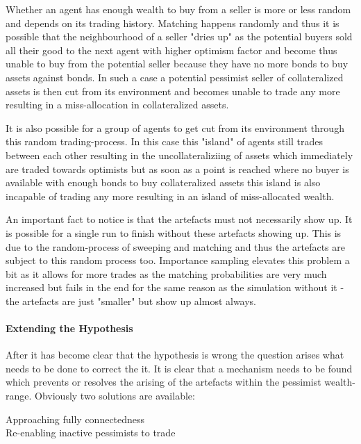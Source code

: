 \documentclass[Bachelorarbeit.tex]{subfiles}
\begin{document}
\medskip 

Whether an agent has enough wealth to buy from a seller is more or less random and depends on its trading history. Matching happens randomly and thus it is possible that the neighbourhood of a seller "dries up" as the potential buyers sold all their good to the next agent with higher optimism factor and become thus unable to buy from the potential seller because they have no more bonds to buy assets against bonds. In such a case a potential pessimist seller of collateralized assets is then cut from its environment and becomes unable to trade any more resulting in a miss-allocation in collateralized assets.

\medskip 

It is also possible for a group of agents to get cut from its environment through this random trading-process. In this case this "island" of agents still trades between each other resulting in the uncollateraliziing of assets which immediately are traded towards optimists but as soon as a point is reached where no buyer is available with enough bonds to buy collateralized assets this island is also incapable of trading any more resulting in an island of miss-allocated wealth.

\medskip 

An important fact to notice is that the artefacts must not necessarily show up. It is possible for a single run to finish without these artefacts showing up. This is due to the random-process of sweeping and matching and thus the artefacts are subject to this random process too. Importance sampling elevates this problem a bit as it allows for more trades as the matching probabilities are very much increased but fails in the end for the same reason as the simulation without it - the artefacts are just "smaller" but show up almost always.

\paragraph{Extending the Hypothesis}
After it has become clear that the hypothesis is wrong the question arises what needs to be done to correct the it. It is clear that a mechanism needs to be found which prevents or resolves the arising of the artefacts within the pessimist wealth-range. Obviously two solutions are available:

\begin{tabbing}
Approaching fully connectedness \\
Re-enabling inactive pessimists to trade \\
\end{tabbing}
\end{document}
